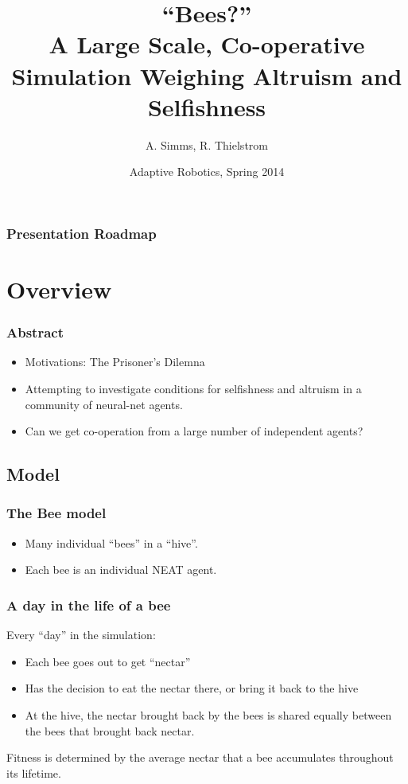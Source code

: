 \documentclass{beamer}
\title[Bees?]{``Bees?''\\ A Large Scale, Co-operative Simulation Weighing 
              Altruism and Selfishness}
\author{A. Simms, R. Thielstrom}
\institute{Swarthmore College}
\date{Adaptive Robotics, Spring 2014}
\begin{document}
  
  \begin{frame}[t]
    \titlepage
  \end{frame}


  \begin{frame}[t]\frametitle{Presentation Roadmap}
    \setcounter{tocdepth}{2}
    \tableofcontents
    \setcounter{tocdepth}{3}
  \end{frame}

  \section{Overview} %
  \label{sec:overview}

    \begin{frame}[c]\frametitle{Abstract}
      \begin{itemize}
        \item Motivations: The Prisoner's Dilemna
        \item Attempting to investigate conditions for selfishness and altruism
              in a community of neural-net agents.
        \item Can we get co-operation from a large number of independent 
              agents?
      \end{itemize}
    \end{frame}

    \subsection{Model} %
    \label{sub:model}
      
      \begin{frame}[c]\frametitle{The Bee model}
        \begin{itemize}
          \item Many individual ``bees'' in a ``hive''.
          \item Each bee is an individual NEAT agent.
        \end{itemize}
      \end{frame}

    \begin{frame}[c]\frametitle{A day in the life of a bee}
      Every ``day'' in the simulation:
      \begin{itemize}
        \item Each bee goes out to get ``nectar''
        \item Has the decision to eat the nectar there, or bring it 
              back to the hive
        \item At the hive, the nectar brought back by the bees is 
              shared equally between the bees that brought back nectar.
      \end{itemize}
      Fitness is determined by the average nectar that a bee accumulates
      throughout its lifetime.
    \end{frame}
\end{document}
